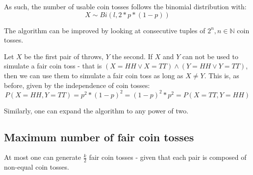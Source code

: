 \documentclass[a4paper]{scrreprt}
\begin{document}
As such, the number of usable coin tosses follows the binomial distribution
with:
\[
	X \sim Bi(l, 2 * p * (1-p))
\]

The algorithm can be improved by looking at consecutive tuples of $2^n, n \in
\mathbb{N}$ coin tosses.

Let $X$ be the first pair of throws, $Y$ the second. If $X$ and $Y$ can not be
used to simulate a fair coin toss - that is $(X = HH \lor X = TT) \land (Y = HH
\lor Y = TT)$, then we can use them to simulate a fair coin toss as long as $X
\neq Y$. This is, as before, given by the independence of coin tosses:
\[
	P(X=HH, Y=TT) = p^2 * (1-p)^2 = (1-p)^2 * p^2 = P(X=TT, Y=HH)
\]

Similarly, one can expand the algorithm to any power of two.

\subsection{Maximum number of fair coin tosses}

At most one can generate $\frac{k}{2}$ fair coin tosses - given that each pair
is composed of non-equal coin tosses.
\end{document}
